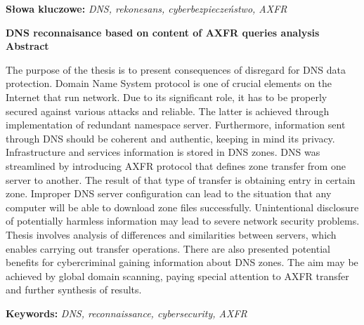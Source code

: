 \noindent\textbf{Słowa kluczowe:} \textit{DNS, rekonesans, cyberbezpieczeństwo, AXFR}\\
\newpage
\null
\newpage
\begin{center}
	\fontsize{18pt}{12pt}\selectfont\textbf{DNS reconnaisance based on content of AXFR queries analysis}\\
	\vspace{1cm}
	\fontsize{14pt}{12pt}\selectfont
	\textbf{Abstract}
\end{center}
The purpose of the thesis is to present consequences of disregard for DNS data protection. Domain Name System protocol is one of
crucial elements on the Internet that run network. Due to its significant role, it has to be properly secured against various
attacks and reliable. The latter is achieved through implementation of redundant namespace server. Furthermore, information sent
through DNS should be coherent and authentic, keeping in mind its privacy. Infrastructure and services information is stored in DNS zones.
DNS was streamlined by introducing AXFR protocol that defines zone transfer from one server to another. The result of that type
of transfer is obtaining entry in certain zone. Improper DNS server configuration can lead to the situation that any computer
will be able to download zone files successfully.
Unintentional disclosure of potentially harmless information may lead to severe network security problems.
Thesis involves analysis of differences and similarities between servers, which enables carrying out transfer operations.
There are also presented potential benefits for cybercriminal gaining information about DNS zones.
The aim may be achieved by global domain scanning, paying special attention to AXFR transfer and further synthesis of results.\\
\vspace{1cm}

\noindent\textbf{Keywords:} \textit{DNS, reconnaissance, cybersecurity, AXFR}\\
\vspace{1.5cm}

\newpage
\null
\newpage
